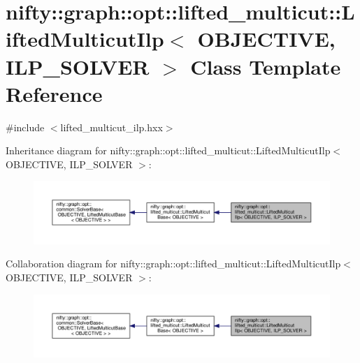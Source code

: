 \hypertarget{classnifty_1_1graph_1_1opt_1_1lifted__multicut_1_1LiftedMulticutIlp}{}\section{nifty\+:\+:graph\+:\+:opt\+:\+:lifted\+\_\+multicut\+:\+:Lifted\+Multicut\+Ilp$<$ O\+B\+J\+E\+C\+T\+I\+VE, I\+L\+P\+\_\+\+S\+O\+L\+V\+ER $>$ Class Template Reference}
\label{classnifty_1_1graph_1_1opt_1_1lifted__multicut_1_1LiftedMulticutIlp}


{\ttfamily \#include $<$lifted\+\_\+multicut\+\_\+ilp.\+hxx$>$}



Inheritance diagram for nifty\+:\+:graph\+:\+:opt\+:\+:lifted\+\_\+multicut\+:\+:Lifted\+Multicut\+Ilp$<$ O\+B\+J\+E\+C\+T\+I\+VE, I\+L\+P\+\_\+\+S\+O\+L\+V\+ER $>$\+:
\nopagebreak
\begin{figure}[H]
\begin{center}
\leavevmode
\includegraphics[width=350pt]{classnifty_1_1graph_1_1opt_1_1lifted__multicut_1_1LiftedMulticutIlp__inherit__graph}
\end{center}
\end{figure}


Collaboration diagram for nifty\+:\+:graph\+:\+:opt\+:\+:lifted\+\_\+multicut\+:\+:Lifted\+Multicut\+Ilp$<$ O\+B\+J\+E\+C\+T\+I\+VE, I\+L\+P\+\_\+\+S\+O\+L\+V\+ER $>$\+:
\nopagebreak
\begin{figure}[H]
\begin{center}
\leavevmode
\includegraphics[width=350pt]{classnifty_1_1graph_1_1opt_1_1lifted__multicut_1_1LiftedMulticutIlp__coll__graph}
\end{center}
\end{figure}
